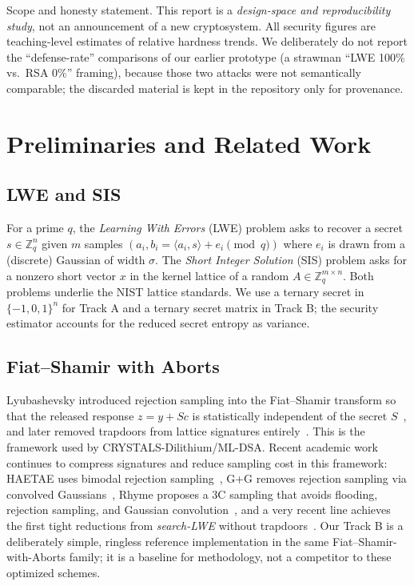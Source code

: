 \documentclass[11pt]{article}
\newcommand{\Zq}{\mathbb{Z}_q}
\begin{document}
Scope and honesty statement. This report is a \emph{design-space and
reproducibility study}, not an announcement of a new cryptosystem.  All
security figures are teaching-level estimates of relative hardness trends.  We
deliberately do not report the ``defense-rate'' comparisons of our earlier
prototype (a strawman ``LWE 100\% vs.\ RSA 0\%'' framing), because those two
attacks were not semantically comparable; the discarded material is kept in the
repository only for provenance.

\section{Preliminaries and Related Work}\label{sec:bg}

\subsection{LWE and SIS}
For a prime $q$, the \emph{Learning With Errors} (LWE) problem asks to recover a
secret $s\in\Zq^n$ given $m$ samples $(a_i, b_i = \langle a_i, s\rangle + e_i
\pmod q)$ where $e_i$ is drawn from a (discrete) Gaussian of width $\sigma$.
The \emph{Short Integer Solution} (SIS) problem asks for a nonzero short vector
$x$ in the kernel lattice of a random $A\in\Zq^{m\times n}$.  Both problems
underlie the NIST lattice standards.  We use a ternary secret in
$\{-1,0,1\}^n$ for Track A and a ternary secret matrix in Track B; the security
estimator accounts for the reduced secret entropy as variance.

\subsection{Fiat--Shamir with Aborts}
Lyubashevsky introduced rejection sampling into the Fiat--Shamir transform so
that the released response $z = y + Sc$ is statistically independent of the
secret $S$~\cite{lyubashevsky2009fsa}, and later removed trapdoors from lattice
signatures entirely~\cite{lyubashevsky2012lswt}.  This is the framework used by
CRYSTALS-Dilithium/ML-DSA.  Recent academic work continues to compress
signatures and reduce sampling cost in this framework: HAETAE uses bimodal
rejection sampling~\cite{haetae2024}, G+G removes rejection sampling via
convolved Gaussians~\cite{gg2023}, Rhyme proposes a 3C sampling that avoids
flooding, rejection sampling, and Gaussian convolution~\cite{rhyme2025}, and a
very recent line achieves the first tight reductions from
\emph{search-LWE} without trapdoors~\cite{tightlwe2026}.  Our Track B is a
deliberately simple, ringless reference implementation in the same
Fiat--Shamir-with-Aborts family; it is a baseline for methodology, not a
competitor to these optimized schemes.
\end{document}
